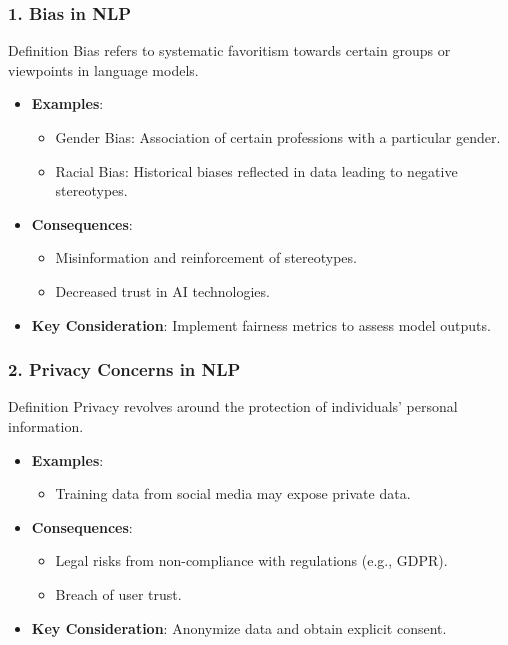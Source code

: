 \documentclass[aspectratio=169]{beamer}
\begin{document}
\begin{frame}[fragile]
    \frametitle{1. Bias in NLP}
    \begin{block}{Definition}
        Bias refers to systematic favoritism towards certain groups or viewpoints in language models.
    \end{block}
    
    \begin{itemize}
        \item \textbf{Examples}:
        \begin{itemize}
            \item Gender Bias: Association of certain professions with a particular gender.
            \item Racial Bias: Historical biases reflected in data leading to negative stereotypes.
        \end{itemize}
        
        \item \textbf{Consequences}:
        \begin{itemize}
            \item Misinformation and reinforcement of stereotypes.
            \item Decreased trust in AI technologies.
        \end{itemize}
        
        \item \textbf{Key Consideration}: Implement fairness metrics to assess model outputs.
    \end{itemize}
\end{frame}

\begin{frame}[fragile]
    \frametitle{2. Privacy Concerns in NLP}
    \begin{block}{Definition}
        Privacy revolves around the protection of individuals' personal information.
    \end{block}
    
    \begin{itemize}
        \item \textbf{Examples}:
        \begin{itemize}
            \item Training data from social media may expose private data.
        \end{itemize}
        
        \item \textbf{Consequences}:
        \begin{itemize}
            \item Legal risks from non-compliance with regulations (e.g., GDPR).
            \item Breach of user trust.
        \end{itemize}
        
        \item \textbf{Key Consideration}: Anonymize data and obtain explicit consent.
    \end{itemize}
\end{frame}
\end{document}
